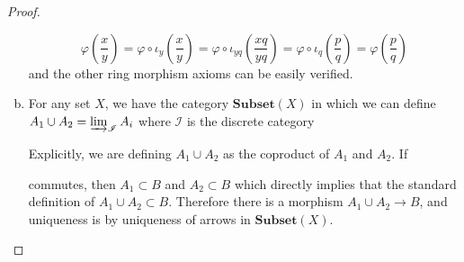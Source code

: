 \documentclass{article}
\newcommand{\fI}{\mathscr{I}}
\newcommand{\Ssubset}{\mathbf{Subset}} %
\begin{document}
\begin{proof}
\begin{enumerate}[(a)]
        \[
        \varphi(\frac{x}{y})=\varphi\circ \iota_y(\frac{x}{y})=\varphi\circ \iota_{yq}(\frac{xq}{yq})=\varphi\circ \iota_{q}(\frac{p}{q})=\varphi(\frac{p}{q})
        \]
        and the other ring morphism axioms can be easily verified.
        \item 
        For any set $X$, we have the category $\Ssubset(X)$ in which we can define $A_1\cup A_2=\varinjlim_{\fI}A_i$ where $\fI$ is the discrete category
        \begin{center}
        \end{center}
        Explicitly, we are defining $A_1\cup A_2$ as the coproduct of $A_1$ and $A_2$. If
        \begin{center}
        \end{center}
        commutes, then $A_1\subset B$ and $A_2\subset B$ which directly implies that the standard definition of $A_1\cup A_2\subset B$. Therefore there is a morphism $A_1\cup A_2\to B$, and uniqueness is by uniqueness of arrows in $\Ssubset(X)$.
    \end{enumerate}
\end{proof}
\end{document}
